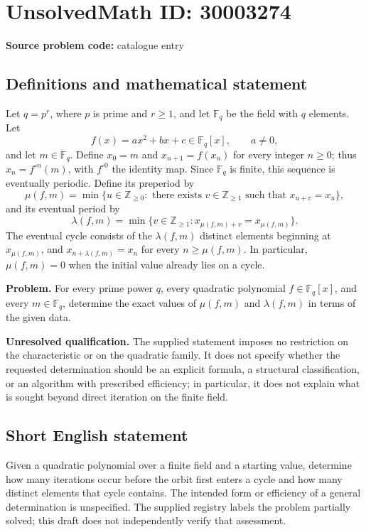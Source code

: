 \documentclass[11pt]{article}
\newcommand{\Z}{\mathbb{Z}}
\newcommand{\F}{\mathbb{F}}
\begin{document}
\section*{UnsolvedMath ID: 30003274}
\textbf{Source problem code:} catalogue entry
\subsection{Definitions and mathematical statement}
Let \(q=p^r\), where \(p\) is prime and \(r\geq 1\), and let \(\F_q\) be the field with \(q\) elements. Let
\[
f(x)=ax^2+bx+c\in\F_q[x],\qquad a\neq 0,
\]
and let \(m\in\F_q\). Define \(x_0=m\) and \(x_{n+1}=f(x_n)\) for every integer \(n\geq 0\); thus \(x_n=f^{\circ n}(m)\), with \(f^{\circ 0}\) the identity map. Since \(\F_q\) is finite, this sequence is eventually periodic. Define its preperiod by
\[
\mu(f,m)=\min\bigl\{u\in\Z_{\geq 0}:\text{ there exists }v\in\Z_{\geq 1}\text{ such that }x_{u+v}=x_u\bigr\},
\]
and its eventual period by
\[
\lambda(f,m)=\min\bigl\{v\in\Z_{\geq 1}:x_{\mu(f,m)+v}=x_{\mu(f,m)}\bigr\}.
\]
The eventual cycle consists of the \(\lambda(f,m)\) distinct elements beginning at \(x_{\mu(f,m)}\), and \(x_{n+\lambda(f,m)}=x_n\) for every \(n\geq\mu(f,m)\). In particular, \(\mu(f,m)=0\) when the initial value already lies on a cycle.

\textbf{Problem.} For every prime power \(q\), every quadratic polynomial \(f\in\F_q[x]\), and every \(m\in\F_q\), determine the exact values of \(\mu(f,m)\) and \(\lambda(f,m)\) in terms of the given data.

\textbf{Unresolved qualification.} The supplied statement imposes no restriction on the characteristic or on the quadratic family. It does not specify whether the requested determination should be an explicit formula, a structural classification, or an algorithm with prescribed efficiency; in particular, it does not explain what is sought beyond direct iteration on the finite field.
\subsection{Short English statement}
Given a quadratic polynomial over a finite field and a starting value, determine how many iterations occur before the orbit first enters a cycle and how many distinct elements that cycle contains. The intended form or efficiency of a general determination is unspecified. The supplied registry labels the problem partially solved; this draft does not independently verify that assessment.
\end{document}
